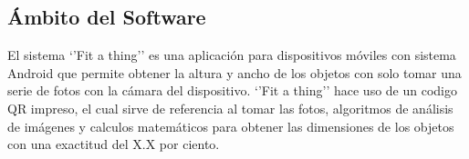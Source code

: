 \subsection{Ámbito del Software}
El sistema `'Fit a thing'' es una aplicación para dispositivos  móviles con sistema Android que permite obtener la altura y ancho de los objetos con solo tomar una serie de fotos con la cámara del dispositivo. `'Fit a thing'' hace uso de un codigo QR impreso, el cual sirve de referencia al tomar las fotos, algoritmos de análisis de imágenes y calculos matemáticos para obtener las dimensiones de los objetos con una exactitud del X.X por ciento.